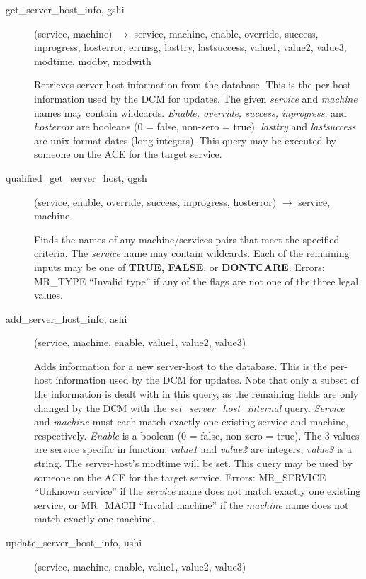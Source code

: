 \documentclass{article}
\begin{document}
\begin{description}
\item[get\_server\_host\_info, gshi](service, machine) $\rightarrow$ service,
machine, enable, override, success, inprogress, hosterror, errmsg,
lasttry, lastsuccess, value1, value2, value3, modtime, modby, modwith

Retrieves server-host information from the database.  This is the
per-host information used by the DCM for updates.  The given
{\em service} and {\em machine} names may contain wildcards.  {\em Enable,
override, success, inprogress}, and {\em hosterror} are booleans (0 =
false, non-zero = true).  {\em lasttry} and {\em lastsuccess} are unix
format dates (long integers).  This query may be executed by someone
on the ACE for the target service.

\item[qualified\_get\_server\_host, qgsh](service, enable, override, success,
inprogress, hosterror) $\rightarrow$ service, machine

Finds the names of any machine/services pairs that meet the specified
criteria.  The {\em service} name may contain wildcards.  Each of the
remaining inputs may be one of {\bf TRUE, FALSE}, or {\bf DONTCARE}.
Errors: MR\_TYPE ``Invalid type'' if any of the flags are not one of the
three legal values.

\item[add\_server\_host\_info, ashi](service, machine, enable, value1, value2,
value3)

Adds information for a new server-host to the database.  This is the
per-host information used by the DCM for updates.  Note that only a
subset of the information is dealt with in this query, as the
remaining fields are only changed by the DCM with the
{\em set\_server\_host\_internal} query.  {\em Service} and {\em machine} must
each match exactly one existing service and machine, respectively.
{\em Enable} is a boolean (0 = false, non-zero = true).  The 3 values
are service specific in function; {\em value1} and {\em value2} are
integers, {\em value3} is a string.  The server-host's modtime will be
set.  This query may be used by someone on the ACE for the target
service.  Errors: MR\_SERVICE ``Unknown service'' if the {\em service}
name does not match exactly one existing service, or MR\_MACH ``Invalid
machine'' if the {\em machine} name does not match exactly one machine.

\item[update\_server\_host\_info, ushi](service, machine, enable, value1,
value2, value3)


\end{description}
\end{document}
